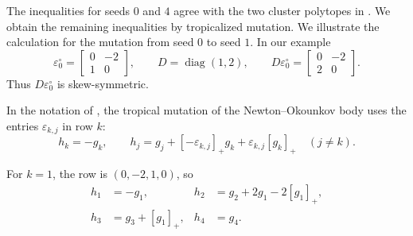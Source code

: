 \documentclass[10pt]{amsart}
\numberwithin{equation}{section}
\theoremstyle{plain}
\theoremstyle{definition}
\theoremstyle{remark}
\begin{document}
The inequalities for seeds $0$ and $4$ agree with the two
cluster polytopes in \cite[Example~6.33]{FujitaOya}.
We obtain the remaining inequalities by tropicalized mutation.
We illustrate the calculation for the mutation from seed $0$ to seed $1$.
In our example
\[
\varepsilon_0^{\circ}=\begin{bmatrix}0&-2\\1&0\end{bmatrix},\qquad
D=\operatorname{diag}(1,2),\qquad
D\varepsilon_0^{\circ}=\begin{bmatrix}0&-2\\2&0\end{bmatrix}.
\]
Thus $D\varepsilon_0^{\circ}$ is skew-symmetric. 

In the notation of \cite[Equation~(4.1) and Corollary~5.7(2)]{FujitaOya},
the tropical mutation of the Newton--Okounkov body uses the entries
$\varepsilon_{k,j}$ in row $k$:
\[
h_k=-g_k,\qquad
h_j=g_j+[-\varepsilon_{k,j}]_+g_k
+\varepsilon_{k,j}[g_k]_+\quad(j\ne k).
\]

For $k=1$, the row is $(0,-2,1,0)$, so
\begin{equation}\label{eq_B2_first_tropical_mutation}
	\begin{aligned}
		h_1&=-g_1,& h_2&=g_2+2g_1-2[g_1]_+,\\
		h_3&=g_3+[g_1]_+,& h_4&=g_4.
	\end{aligned}
\end{equation}
\end{document}
